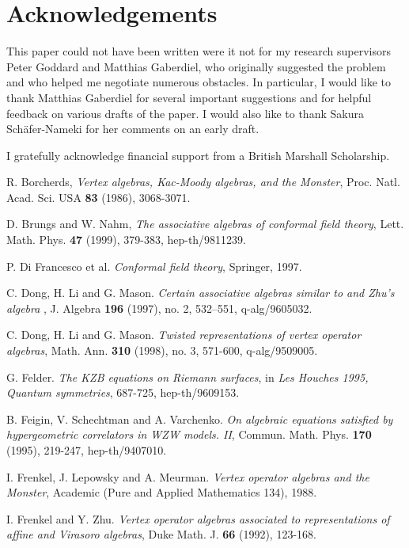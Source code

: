 \documentclass[a4paper,12pt]{article}
\providecommand{\ti}[1]{\textit{#1}}
\begin{document}
\section*{Acknowledgements} \label{ack}

This paper could not have been written were it not for my research supervisors Peter Goddard and Matthias Gaberdiel,
who originally suggested the problem and who helped me negotiate numerous obstacles.  In particular, I would like to thank
Matthias Gaberdiel for several important suggestions and for helpful feedback on various drafts of the paper.  I would
also like to thank Sakura Sch\"afer-Nameki for her comments on an early draft.

I gratefully acknowledge financial support from a British Marshall Scholarship.


\begin{thebibliography}{99}

 R. Borcherds, \ti{Vertex algebras, Kac-Moody algebras, and the Monster},
Proc. Natl. Acad. Sci. USA \textbf{83} (1986), 3068-3071.

 D. Brungs and W. Nahm, \ti{The associative algebras of conformal field theory}, Lett. Math. Phys. \textbf{47} (1999), 379-383, hep-th/9811239.

 P. Di Francesco et al.  \ti{Conformal field theory}, Springer, 1997.

 C. Dong, H. Li and G. Mason.  \ti{Certain associative algebras similar to \myHighlight{$U(sl_{2})$}\coordHE{} and Zhu's algebra \myHighlight{$A(V_{L})$}\coordHE{}}, J. Algebra \textbf{196} (1997), no. 2, 532--551, q-alg/9605032.

 C. Dong, H. Li and G. Mason.  \ti{Twisted representations of vertex operator algebras}, Math. Ann. \textbf{310} (1998), no. 3, 571-600, q-alg/9509005.

 G. Felder.  \ti{The KZB equations on Riemann surfaces}, in \ti{Les Houches 1995, Quantum symmetries}, 687-725, hep-th/9609153.

 B. Feigin, V. Schechtman and A. Varchenko.  \ti{On algebraic equations satisfied by hypergeometric
correlators in WZW models. II}, Commun. Math. Phys. \textbf{170} (1995), 219-247, hep-th/9407010.

 I. Frenkel, J. Lepowsky and A. Meurman.  \ti{Vertex operator algebras and the Monster}, Academic (Pure and Applied Mathematics 134), 1988. 

 I. Frenkel and Y. Zhu.  \ti{Vertex operator algebras associated to representations of affine and Virasoro algebras}, Duke Math. J. \textbf{66} (1992), 123-168.


\end{thebibliography}
\end{document}
